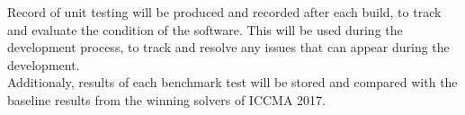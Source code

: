 Record of unit testing will be produced and recorded after each build, to track and evaluate the condition of the software. This will be used during the development process, to track and resolve any issues that can appear during the development.
\\
Additionaly, results of each benchmark test will be stored and compared with the baseline results from the winning solvers of ICCMA 2017.